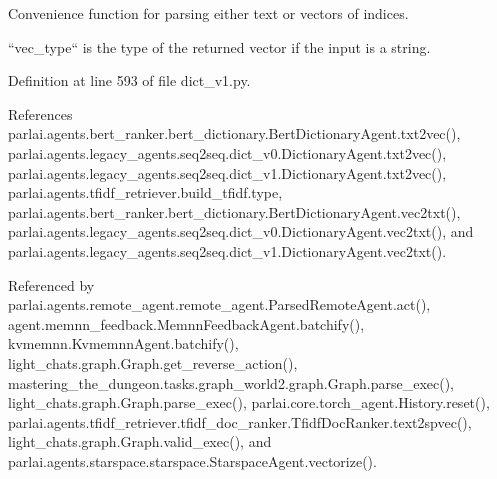\begin{DoxyVerb}Convenience function for parsing either text or vectors of indices.

``vec_type`` is the type of the returned vector if the input is a string.
\end{DoxyVerb}
 

Definition at line 593 of file dict\+\_\+v1.\+py.



References parlai.\+agents.\+bert\+\_\+ranker.\+bert\+\_\+dictionary.\+Bert\+Dictionary\+Agent.\+txt2vec(), parlai.\+agents.\+legacy\+\_\+agents.\+seq2seq.\+dict\+\_\+v0.\+Dictionary\+Agent.\+txt2vec(), parlai.\+agents.\+legacy\+\_\+agents.\+seq2seq.\+dict\+\_\+v1.\+Dictionary\+Agent.\+txt2vec(), parlai.\+agents.\+tfidf\+\_\+retriever.\+build\+\_\+tfidf.\+type, parlai.\+agents.\+bert\+\_\+ranker.\+bert\+\_\+dictionary.\+Bert\+Dictionary\+Agent.\+vec2txt(), parlai.\+agents.\+legacy\+\_\+agents.\+seq2seq.\+dict\+\_\+v0.\+Dictionary\+Agent.\+vec2txt(), and parlai.\+agents.\+legacy\+\_\+agents.\+seq2seq.\+dict\+\_\+v1.\+Dictionary\+Agent.\+vec2txt().



Referenced by parlai.\+agents.\+remote\+\_\+agent.\+remote\+\_\+agent.\+Parsed\+Remote\+Agent.\+act(), agent.\+memnn\+\_\+feedback.\+Memnn\+Feedback\+Agent.\+batchify(), kvmemnn.\+Kvmemnn\+Agent.\+batchify(), light\+\_\+chats.\+graph.\+Graph.\+get\+\_\+reverse\+\_\+action(), mastering\+\_\+the\+\_\+dungeon.\+tasks.\+graph\+\_\+world2.\+graph.\+Graph.\+parse\+\_\+exec(), light\+\_\+chats.\+graph.\+Graph.\+parse\+\_\+exec(), parlai.\+core.\+torch\+\_\+agent.\+History.\+reset(), parlai.\+agents.\+tfidf\+\_\+retriever.\+tfidf\+\_\+doc\+\_\+ranker.\+Tfidf\+Doc\+Ranker.\+text2spvec(), light\+\_\+chats.\+graph.\+Graph.\+valid\+\_\+exec(), and parlai.\+agents.\+starspace.\+starspace.\+Starspace\+Agent.\+vectorize().

